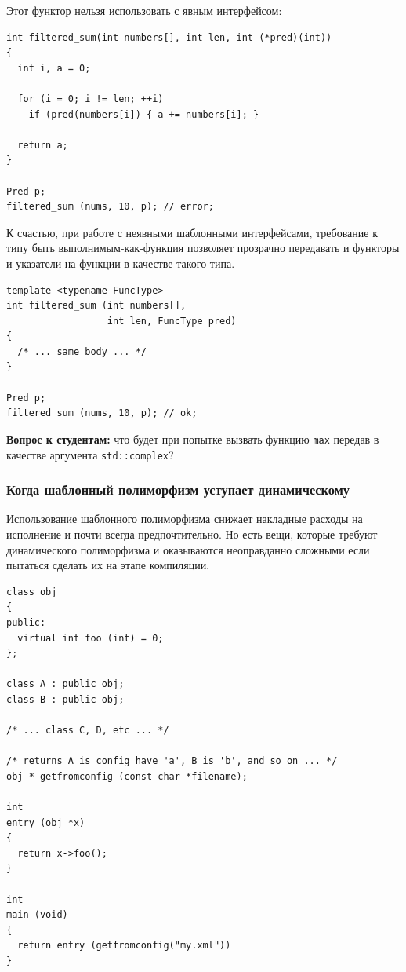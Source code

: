 \documentclass[a4paper,12pt,oneside]{article}
\newif\ifanswers
\begin{document}
Этот функтор нельзя использовать с явным интерфейсом:

\begin{lstlisting}
int filtered_sum(int numbers[], int len, int (*pred)(int))
{
  int i, a = 0;

  for (i = 0; i != len; ++i)
    if (pred(numbers[i]) { a += numbers[i]; }

  return a;
}

Pred p;
filtered_sum (nums, 10, p); // error;
\end{lstlisting}

К счастью, при работе с неявными шаблонными интерфейсами, требование к типу быть выполнимым-как-функция позволяет прозрачно передавать и функторы и указатели на функции в качестве такого типа.
 
\begin{lstlisting}
template <typename FuncType>
int filtered_sum (int numbers[], 
                  int len, FuncType pred) 
{ 
  /* ... same body ... */ 
}

Pred p;
filtered_sum (nums, 10, p); // ok;
\end{lstlisting}

\textbf{Вопрос к студентам:} что будет при попытке вызвать функцию \lstinline!max! передав в качестве аргумента \lstinline!std::complex!?

\ifanswers
Правильный ответ: увы, на комплексных числах нельзя ввести ни порядка ни даже частичного порядка. Будет ошибка компиляции.
\fi

\subsubsection{Когда шаблонный полиморфизм уступает динамическому}\label{DynamicBetterStatic}

Использование шаблонного полиморфизма снижает накладные расходы на исполнение и почти всегда предпочтительно. Но есть вещи, которые требуют динамического полиморфизма и оказываются неоправданно сложными если пытаться сделать их на этапе компиляции.

\begin{lstlisting}
class obj
{
public:
  virtual int foo (int) = 0;    
};

class A : public obj;
class B : public obj;

/* ... class C, D, etc ... */

/* returns A is config have 'a', B is 'b', and so on ... */
obj * getfromconfig (const char *filename);

int
entry (obj *x)
{
  return x->foo();
}

int
main (void)
{
  return entry (getfromconfig("my.xml"))
}
\end{lstlisting}
\end{document}
